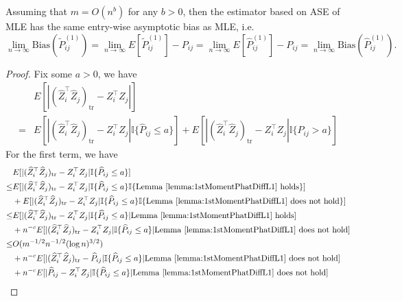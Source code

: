 \begin{lemma}
\label{lm:L1Consistentproof}
Assuming that $m = O(n^b)$ for any $b > 0$, then the estimator based on ASE of MLE has the same entry-wise asymptotic bias as MLE, i.e.\
\[
	\lim_{n \to \infty} \mathrm{Bias}(\widetilde{P}_{ij}^{(1)}) = \lim_{n \to \infty} E[\widetilde{P}_{ij}^{(1)}] - P_{ij} = \lim_{n \to \infty} E[\hat{P}^{(1)}_{ij}] - P_{ij}
    = \lim_{n \to \infty} \mathrm{Bias}(\hat{P}_{ij}^{(1)}).
\]
\end{lemma}
\begin{proof}
Fix some $a > 0$, we have
\begin{align*}
	& E[|(\hat{Z}_i^{\top} \hat{Z}_j)_{\mathrm{tr}} - Z_i^{\top} Z_j|] \\
	= & E[|(\hat{Z}_i^{\top} \hat{Z}_j)_{\mathrm{tr}} - Z_i^{\top} Z_j| \mathbb{I}\{\hat{P}_{ij} \le a\}]
	+ E[|(\hat{Z}_i^{\top} \hat{Z}_j)_{\mathrm{tr}} - Z_i^{\top} Z_j| \mathbb{I}\{\hat{P}_{ij} > a\}]
\end{align*}
For the first term, we have
\begin{align*}
	& E[|(\hat{Z}_i^{\top} \hat{Z}_j)_{\mathrm{tr}} - Z_i^{\top} Z_j| \mathbb{I}\{\hat{P}_{ij} \le a\}] \\
	\le & E[|(\hat{Z}_i^{\top} \hat{Z}_j)_{\mathrm{tr}} - Z_i^{\top} Z_j| \mathbb{I}\{\hat{P}_{ij} \le a\} \mathbb{I}\{\mathrm{Lemma\ } \ref{lemma:1stMomentPhatDiffL1} \mathrm{\ holds}\}] \\
	& + E[|(\hat{Z}_i^{\top} \hat{Z}_j)_{\mathrm{tr}} - Z_i^{\top} Z_j| \mathbb{I}\{\hat{P}_{ij} \le a\} \mathbb{I}\{\mathrm{Lemma\ } \ref{lemma:1stMomentPhatDiffL1} \mathrm{\ does\ not\ hold}\}] \\
	\le & E[|(\hat{Z}_i^{\top} \hat{Z}_j)_{\mathrm{tr}} - Z_i^{\top} Z_j| \mathbb{I}\{\hat{P}_{ij} \le a\} | \mathrm{Lemma\ } \ref{lemma:1stMomentPhatDiffL1} \mathrm{\ holds}] \\
	& + n^{-c} E[|(\hat{Z}_i^{\top} \hat{Z}_j)_{\mathrm{tr}} - Z_i^{\top} Z_j| \mathbb{I}\{\hat{P}_{ij} \le a\} | \mathrm{Lemma\ } \ref{lemma:1stMomentPhatDiffL1} \mathrm{\ does\ not\ hold}] \\
	\le & O(m^{-1/2} n^{-1/2} (\log n)^{3/2}) \\
	& + n^{-c} E[|(\hat{Z}_i^{\top} \hat{Z}_j)_{\mathrm{tr}} - \hat{P}_{ij}| \mathbb{I}\{\hat{P}_{ij} \le a\}| \mathrm{Lemma\ } \ref{lemma:1stMomentPhatDiffL1} \mathrm{\ does\ not\ hold}] \\
	& + n^{-c} E[|\hat{P}_{ij} - Z_i^{\top} Z_j| \mathbb{I}\{\hat{P}_{ij} \le a\}| \mathrm{Lemma\ } \ref{lemma:1stMomentPhatDiffL1} \mathrm{\ does\ not\ hold}] \\

\end{align*}
\end{proof}
